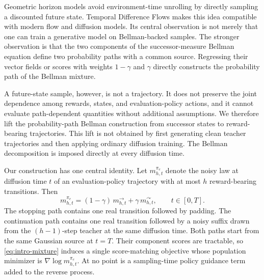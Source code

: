 \documentclass[11pt]{article}
\theoremstyle{definition}
\theoremstyle{remark}
\newcommand{\targetpi}{\pi_e}
\newcommand{\branchstop}{\rightarrow}
\newcommand{\branchcont}{\curvearrowright}
\begin{document}
Geometric horizon models avoid environment-time unrolling by directly
sampling a discounted future state. Temporal Difference Flows
\citep{farebrother2025tdflow} makes this idea compatible with modern flow and
diffusion models. Its central observation is not merely that one can train a
generative model on Bellman-backed samples. The stronger observation is that
the two components of the successor-measure Bellman equation define two
probability paths with a common source. Regressing their vector fields or
scores with weights $1-\gamma$ and $\gamma$ directly constructs the
probability path of the Bellman mixture.

A future-state sample, however, is not a trajectory. It does not preserve the
joint dependence among rewards, states, and evaluation-policy actions, and it
cannot evaluate path-dependent quantities without additional assumptions. We
therefore lift the probability-path Bellman construction from successor states
to reward-bearing trajectories. This lift is not obtained by first generating
clean teacher trajectories and then applying ordinary diffusion training. The
Bellman decomposition is imposed directly at every diffusion time.

Our construction has one central identity. Let $m_{h,t}^{\targetpi}$ denote
the noisy law at diffusion time $t$ of an evaluation-policy trajectory with at
most $h$ reward-bearing transitions. Then
\begin{equation}
\boxed{
 m_{h,t}^{\targetpi}
 =
 (1-\gamma)\,m_{h,t}^{\branchstop}
 +
 \gamma\,m_{h,t}^{\branchcont},
 \qquad t\in[0,T].
}
\label{eq:intro-mixture}
\end{equation}
The stopping path contains one real transition followed by padding. The
continuation path contains one real transition followed by a noisy suffix drawn
from the $(h-1)$-step teacher at the same diffusion time. Both paths start from
the same Gaussian source at $t=T$. Their component scores are tractable, so
\cref{eq:intro-mixture} induces a single score-matching objective whose
population minimizer is $\nabla\log m_{h,t}^{\targetpi}$. At no point is a
sampling-time policy guidance term added to the reverse process.
\end{document}
